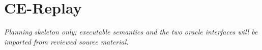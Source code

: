 \section{CE-Replay}
\textit{Planning skeleton only; executable semantics and the two oracle
interfaces will be imported from reviewed source material.}

